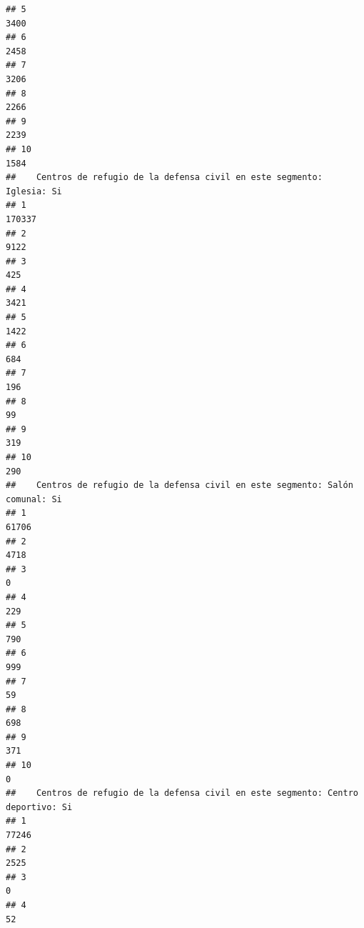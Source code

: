 \documentclass[11pt,]{article}
\begin{document}
\begin{verbatim}
## 5                                                                          3400
## 6                                                                          2458
## 7                                                                          3206
## 8                                                                          2266
## 9                                                                          2239
## 10                                                                         1584
##    Centros de refugio de la defensa civil en este segmento: Iglesia: Si
## 1                                                                170337
## 2                                                                  9122
## 3                                                                   425
## 4                                                                  3421
## 5                                                                  1422
## 6                                                                   684
## 7                                                                   196
## 8                                                                    99
## 9                                                                   319
## 10                                                                  290
##    Centros de refugio de la defensa civil en este segmento: Salón comunal: Si
## 1                                                                       61706
## 2                                                                        4718
## 3                                                                           0
## 4                                                                         229
## 5                                                                         790
## 6                                                                         999
## 7                                                                          59
## 8                                                                         698
## 9                                                                         371
## 10                                                                          0
##    Centros de refugio de la defensa civil en este segmento: Centro deportivo: Si
## 1                                                                          77246
## 2                                                                           2525
## 3                                                                              0
## 4                                                                             52

\end{verbatim}
\end{document}
